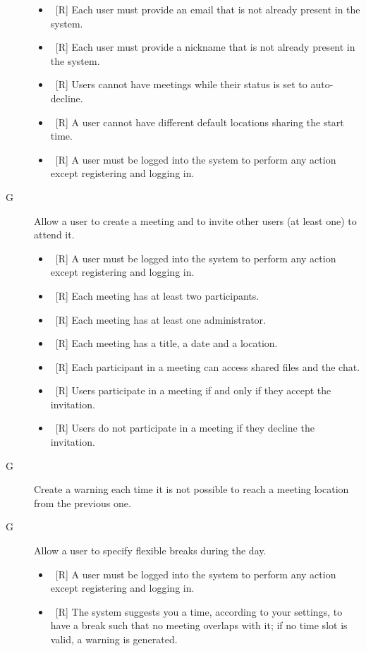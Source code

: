 \begin{description}
\begin{itemize}
\item~[R] Each user must provide an email that is not already present in the system.
\item~[R] Each user must provide a nickname that is not already present in the system.
\item~[R] Users cannot have meetings while their status is set to auto-decline.
\item~[R] A user cannot have different default locations sharing the start time.
\item~[R] A user must be logged into the system to perform any action except registering and logging in.
\end{itemize}

\item[G\thecountReq] Allow a user to create a meeting and to invite other users (at least one) to attend it.

\begin{itemize}
\item~[R] A user must be logged into the system to perform any action except registering and logging in.
\item~[R] Each meeting has at least two participants.
\item~[R] Each meeting has at least one administrator.
\item~[R] Each meeting has a title, a date and a location.
\item~[R] Each participant in a meeting can access shared files and the chat.
\item~[R] Users participate in a meeting if and only if they accept the invitation.
\item~[R] Users do not participate in a meeting if they decline the invitation.
\end{itemize}

\item[G\thecountReq] Create a warning each time it is not possible to reach a meeting location from the previous one.

\item[G\thecountReq] Allow a user to specify flexible breaks during the day.

\begin{itemize}
\item~[R] A user must be logged into the system to perform any action except registering and logging in.
\item~[R] The system suggests you a time, according to your settings, to have a break such that no meeting overlaps with it; if no time slot is valid, a warning is generated.
\end{itemize}


\end{description}
